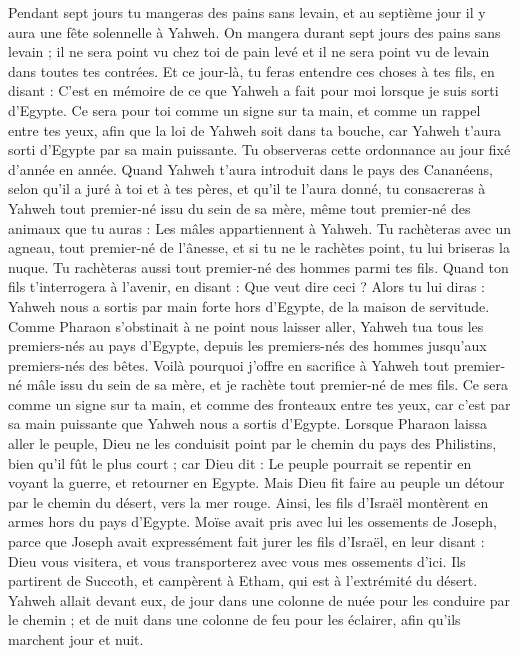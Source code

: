 \begin{multicols}{2}
Pendant sept jours tu mangeras des pains sans levain, et au septième jour il y aura une fête solennelle à Yahweh.
On mangera durant sept jours des pains sans levain ; il ne sera point vu chez toi de pain levé et il ne sera point vu de levain dans toutes tes contrées.
Et ce jour-là, tu feras entendre ces choses à tes fils, en disant : C'est en mémoire de ce que Yahweh a fait pour moi lorsque je suis sorti d'Egypte.
Ce sera pour toi comme un signe sur ta main, et comme un rappel entre tes yeux, afin que la loi de Yahweh soit dans ta bouche, car Yahweh t'aura sorti d'Egypte par sa main puissante\FTNT{}.
Tu observeras cette ordonnance au jour fixé d’année en année.
Quand Yahweh t'aura introduit dans le pays des Cananéens, selon qu'il a juré à toi et à tes pères, et qu'il te l'aura donné,
tu consacreras à Yahweh tout premier-né issu du sein de sa mère, même tout premier-né des animaux que tu auras : Les mâles appartiennent à Yahweh.
Tu rachèteras avec un agneau, tout premier-né de l’ânesse, et si tu ne le rachètes point, tu lui briseras la nuque. Tu rachèteras aussi tout premier-né des hommes parmi tes fils.
Quand ton fils t'interrogera à l'avenir, en disant : Que veut dire ceci ? Alors tu lui diras : Yahweh nous a sortis par main forte hors d'Egypte, de la maison de servitude.
Comme Pharaon s’obstinait à ne point nous laisser aller, Yahweh tua tous les premiers-nés au pays d'Egypte, depuis les premiers-nés des hommes jusqu’aux premiers-nés des bêtes. Voilà pourquoi j’offre en sacrifice à Yahweh tout premier-né mâle issu du sein de sa mère, et je rachète tout premier-né de mes fils.
Ce sera comme un signe sur ta main, et comme des fronteaux entre tes yeux, car c’est par sa main puissante que Yahweh nous a sortis d'Egypte.
Lorsque Pharaon laissa aller le peuple, Dieu ne les conduisit point par le chemin du pays des Philistins, bien qu'il fût le plus court ; car Dieu dit : Le peuple pourrait se repentir en voyant la guerre, et retourner en Egypte.
Mais Dieu fit faire au peuple un détour par le chemin du désert, vers la mer rouge. Ainsi, les fils d'Israël montèrent en armes hors du pays d'Egypte.
Moïse avait pris avec lui les ossements de Joseph, parce que Joseph avait expressément fait jurer les fils d'Israël, en leur disant : Dieu vous visitera, et vous transporterez avec vous mes ossements d'ici\FTNT{}.
Ils partirent de Succoth, et campèrent à Etham, qui est à l’extrémité du désert.
Yahweh allait devant eux, de jour dans une colonne de nuée pour les conduire par le chemin ; et de nuit dans une colonne de feu pour les éclairer, afin qu'ils marchent jour et nuit\FTNT{}.

\end{multicols}
